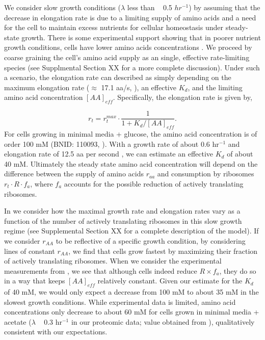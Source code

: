We consider slow growth conditions ($\lambda$ less than ~ 0.5 $hr^{-1}$) by
assuming that the decrease in elongation rate is due to a
limiting supply of amino acids and a need for the cell to maintain excess
nutrients for cellular homeostasis under steady-state growth. There is some
experimental support showing that in poorer nutrient growth conditions, cells
have lower amino acids concentrations  \citep{bennett2009}. We proceed by coarse
graining the cell's amino acid supply as an single, effective rate-limiting
species (see Supplmental Section XX for a more complete discussion). Under such a scenario,
the elongation rate can described as simply depending on the maximum elongation
rate ($\approx$ 17.1 aa/s, \citep{dai2016, dai2018}), an effective $K_d$, and
the limiting amino acid concentration $[AA]_{eff}$. Specifically, the elongation
rate is given by,

\begin{equation}
r_t = r_t^{max} \cdot \frac{1}{1 + K_d / [AA]_{eff}}.
\label{eq:rate_Kd}
\end{equation}
For cells growing in minimal media + glucose, the amino acid concentration is of
order 100 mM  (BNID: 110093, \citep{milo2010, bennett2009}). With a growth rate
of about 0.6 hr$^{-1}$ and elongation rate of 12.5 aa per second
\citep{dai2016}, we can estimate an effective $K_d$ of about 40 mM. Ultimately
the steady state amino acid concentration will depend on the difference between
the supply of amino acids $r_{aa}$ and consumption by ribosomes $r_t \cdot R
\cdot f_a$, where $f_a$ accounts for the possible reduction of actively
translating ribosomes.

In  we consider how the maximal growth rate and
elongation rates vary as a function of the number of actively translating
ribosomes in this slow growth regime (see Supplemental Section XX for a complete
description of the model). If we consider $r_{AA}$ to be reflective of a specific
growth condition, by considering lines of constant $r_{AA}$, we find that cells
grow fastest by maximizing their fraction of actively translating ribosomes.
When we consider the experimental measurements from \cite{dai2018}, we see
that although cells indeed reduce $R \times f_a$, they do so in a way that keeps
$[AA]_{eff}$ relatively constant. Given our estimate for the $K_d$ of 40 mM,  we
would only expect a decrease from 100 mM to about 35 mM in the slowest growth
conditions. While experimental data is limited, amino acid concentrations only
decrease to about 60 mM for cells grown in minimal media + acetate ($\lambda$ ~
0.3 hr$^{-1}$ in our proteomic data; value obtained from \cite{bennett2009}), qualitatively consistent with our expectations.

